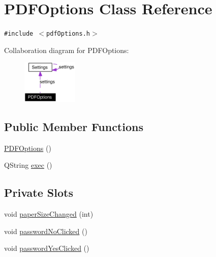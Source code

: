 \hypertarget{classPDFOptions}{
\section{PDFOptions Class Reference}
\label{classPDFOptions}
}
{\tt \#include $<$pdf\-Options.h$>$}

Collaboration diagram for PDFOptions:\begin{figure}[H]
\begin{center}
\leavevmode
\includegraphics[width=75pt]{classPDFOptions__coll__graph}
\end{center}
\end{figure}
\subsection*{Public Member Functions}
\begin{CompactItemize}
\item 
\hyperlink{classPDFOptions_a0}{PDFOptions} ()
\item 
QString \hyperlink{classPDFOptions_a1}{exec} ()
\end{CompactItemize}
\subsection*{Private Slots}
\begin{CompactItemize}
\item 
void \hyperlink{classPDFOptions_k0}{paper\-Size\-Changed} (int)
\item 
void \hyperlink{classPDFOptions_k1}{password\-No\-Clicked} ()
\item 
void \hyperlink{classPDFOptions_k2}{password\-Yes\-Clicked} ()
\end{CompactItemize}
